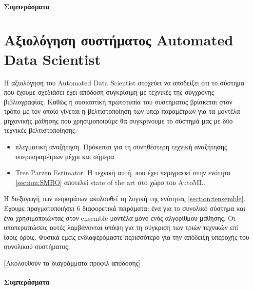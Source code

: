 \paragraph{Συμπεράσματα}
\section{Αξιολόγηση συστήματος Automated Data Scientist}\label{section:eval_system}
Η αξιολόγηση του Automated Data Scientist στοχεύει να αποδείξει ότι το σύστημα που έχουμε σχεδιάσει έχει απόδοση συγκρίσιμη με τεχνικές της σύγχρονης βιβλιογραφίας. Καθώς η ουσιαστική πρωτοτυπία του συστήματος βρίσκεται στον τρόπο με τον οποίο γίνεται η βελτιστοποίηση των υπερ-παρα\-μέ\-τρων για τα μοντέλα μηχανικής μάθησης που χρησιμοποιούμε θα συγκρίνουμε το σύστημά μας με δύο τεχνικές βελτιστοποίησης:
\begin{itemize}
	\item πλεγματική αναζήτηση. Πρόκειται για τη συνηθέστερη τεχνική αναζήτησης υπερ\-παραμέτρων μέχρι και σήμερα.
	\item Tree Parzen Estimator. Η τεχνική αυτή, που έχει περιγραφεί στην ενότητα \ref{section:SMBO} αποτελεί state of the art στο χώρο του AutoML.
\end{itemize}

Η διεξαγωγή των πειραμάτων ακολουθεί τη λογική της ενότητας \ref{section:tensemble}. Έχουμε πραγματοποιήσει 6 διαφορετικά πειράματα: ένα για το συνολικό σύστημα και ένα χρησιμοποιώντας στον ensemble μοντέλα μόνο ενός αλγορίθμου μάθησης. Οι υποπεριπτώσεις αυτές λαμβάνονται υπόψη για τη σύγκριση των τριών τεχνικών επί ίσοις όροις. Φυσικά εμείς ενδιαφερόμαστε περισσότερο για την απόδειξη υπεροχής του συνολικού συστήματος.  

[Ακολουθούν τα διαγράμματα προφίλ απόδοσης]
	
\paragraph{Συμπεράσματα}